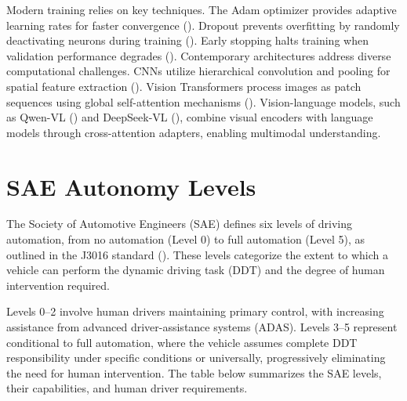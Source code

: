 Modern training relies on key techniques. The Adam optimizer provides adaptive learning rates for faster convergence (\cite{kingma2014adam}). Dropout prevents overfitting by randomly deactivating neurons during training (\cite{srivastava2014dropout}). Early stopping halts training when validation performance degrades (\cite{goodfellow2016deep_early_stopping}).
Contemporary architectures address diverse computational challenges. CNNs utilize hierarchical convolution and pooling for spatial feature extraction (\cite{lecun1998gradient,krizhevsky2012imagenet}). Vision Transformers process images as patch sequences using global self-attention mechanisms (\cite{dosovitskiy2021image}). Vision-language models, such as Qwen-VL (\cite{bai2023qwen}) and DeepSeek-VL (\cite{zeng2024deepseek}), combine visual encoders with language models through cross-attention adapters, enabling multimodal understanding.

\section{SAE Autonomy Levels}

The Society of Automotive Engineers (SAE) defines six levels of driving automation, from no automation (Level 0) to full automation (Level 5), as outlined in the J3016 standard (\cite{SAEJ3016}). These levels categorize the extent to which a vehicle can perform the dynamic driving task (DDT) and the degree of human intervention required.

Levels 0--2 involve human drivers maintaining primary control, with increasing assistance from advanced driver-assistance systems (ADAS). Levels 3--5 represent conditional to full automation, where the vehicle assumes complete DDT responsibility under specific conditions or universally, progressively eliminating the need for human intervention. The table below summarizes the SAE levels, their capabilities, and human driver requirements.

